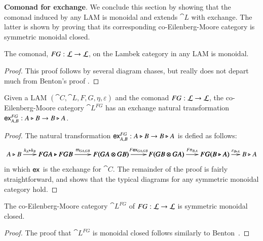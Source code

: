 \textbf{Comonad for exchange}.  We conclude this section by showing
that the comonad induced by any LAM is monoidal and extends $\cat{L}$
with exchange.  The latter is shown by proving that its corresponding
co-Eilenberg-Moore category is symmetric monoidal closed.

\begin{lemma}
  The comonad, $FG : \mathcal{L} \rightarrow \mathcal{L}$, on the Lambek category in any LAM is monoidal.
\end{lemma}
\begin{proof}
  This proof follows by several diagram chases, but really does not
  depart much from Benton's proof \cite{Benton:1994}.
\end{proof}

\begin{theorem}
  \label{thm:em-exchange}
  Given a LAM $(\cat{C},\cat{L},F,G,\eta,\varepsilon)$ and the comonad
  $FG : \mathcal{L} \rightarrow \mathcal{L}$, the co-Eilenberg-Moore category
  $\cat{L}^{FG}$ has an exchange natural transformation $\mathsf{ex}_{A,B}^{FG}:A\triangleright
  B\rightarrow B\triangleright A$.
\end{theorem}
\begin{proof}
  The natural transformation $\mathsf{ex}_{A,B}^{FG}:A\triangleright B\rightarrow B\triangleright A$ is defied
  as follows:
  $$\bfig
    \morphism<600,0>[A\tri B`FGA\tri FGB;h_A\tri h_B]
    \morphism(600,0)<800,0>[FGA\tri FGB`F(GA\otimes GB);\m{GA,GB}]
    \morphism(1400,0)<800,0>[F(GA\otimes GB)`F(GB\otimes GA);F\e{GA,GB}]
    \morphism(2200,0)<700,0>[F(GB\otimes GA)`FG(B\tri A);F\n{B,A}]
    \morphism(2900,0)<500,0>[FG(B\tri A)`B\tri A;\varepsilon_{B\tri A}]
  \efig$$
  in which $\mathsf{ex}_{}$ is the exchange for $\cat{C}$.  The remainder of the
  proof is fairly straightforward, and shows that the typical diagrams
  for any symmetric monoidal category hold.
\end{proof}

\begin{corollary}
  The co-Eilenberg-Moore category $\cat{L}^{FG}$ of $FG : \mathcal{L} \rightarrow
  \mathcal{L}$ is symmetric monoidal closed.
\end{corollary}
\begin{proof}
  The proof that $\cat{L}^{FG}$ is monoidal closed follows similarly
  to Benton~\cite{Benton:1994}.
\end{proof}

